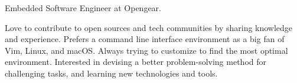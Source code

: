 

\begin{cvparagraph}

Embedded Software Engineer at Opengear.

Love to contribute to open sources and tech communities by sharing knowledge and experience. Prefers a command line interface environment as a big fan of Vim, Linux, and macOS. Always trying to customize to find the most optimal environment. Interested in devising a better problem-solving method for challenging tasks, and learning new technologies and tools.
\end{cvparagraph}
